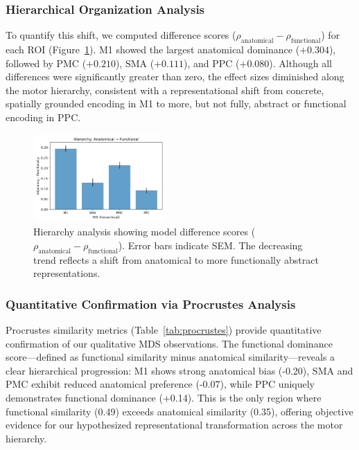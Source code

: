 \documentclass{article}
\begin{document}
\subsubsection{Hierarchical Organization Analysis}
To quantify this shift, we computed difference scores (\(\rho_{\text{anatomical}} - \rho_{\text{functional}}\)) for each ROI (Figure~\ref{fig:hierarchy_analysis}). M1 showed the largest anatomical dominance (\(+0.304\)), followed by PMC (\(+0.210\)), SMA (\(+0.111\)), and PPC (\(+0.080\)). Although all differences were significantly greater than zero, the effect sizes diminished along the motor hierarchy, consistent with a representational shift from concrete, spatially grounded encoding in M1 to more, but not fully, abstract or functional encoding in PPC.
\begin{figure}[!htbp]
\centering
\includegraphics[width=0.45\textwidth]{results/hierarchy_adjacency_vs_functional.png}
\caption{Hierarchy analysis showing model difference scores (\(\rho_{\text{anatomical}} - \rho_{\text{functional}}\)). Error bars indicate SEM. The decreasing trend reflects a shift from anatomical to more functionally abstract representations.}
\label{fig:hierarchy_analysis}
\end{figure}

\subsubsection{Quantitative Confirmation via Procrustes Analysis}

Procrustes similarity metrics (Table~\ref{tab:procrustes}) provide quantitative confirmation of our qualitative MDS observations. The functional dominance score—defined as functional similarity minus anatomical similarity—reveals a clear hierarchical progression: M1 shows strong anatomical bias (-0.20), SMA and PMC exhibit reduced anatomical preference (-0.07), while PPC uniquely demonstrates functional dominance (+0.14). This is the only region where functional similarity (0.49) exceeds anatomical similarity (0.35), offering objective evidence for our hypothesized representational transformation across the motor hierarchy.
\end{document}
